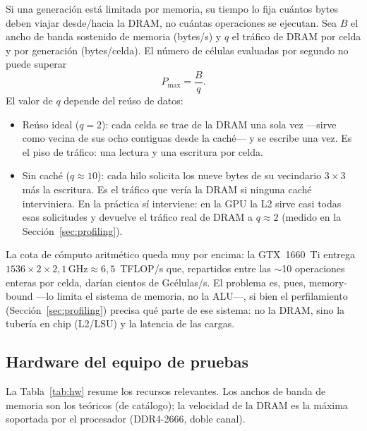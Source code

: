 \documentclass[
	spanish,
	letterpaper, oneside
]{article}
\begin{document}
Si una generación está limitada por memoria, su tiempo lo fija cuántos bytes deben
viajar desde/hacia la DRAM, no cuántas operaciones se ejecutan. Sea $B$ el ancho de
banda sostenido de memoria (bytes/s) y $q$ el tráfico de DRAM por celda y por
generación (bytes/celda). El número de células evaluadas por segundo no puede
superar
%
\begin{equation}
	P_{\max} = \frac{B}{q}.
	\label{eq:roofline}
\end{equation}
%
El valor de $q$ depende del reúso de datos:

\begin{itemize}
	\item Reúso ideal ($q = 2$): cada celda se trae de la DRAM una sola vez
	      ---sirve como vecina de sus ocho contiguas desde la caché--- y se escribe
	      una vez. Es el piso de tráfico: una lectura y una escritura por celda.
	\item Sin caché ($q \approx 10$): cada hilo solicita los nueve
	      bytes de su vecindario $3\times3$ más la escritura. Es el tráfico que vería
	      la DRAM si ninguna caché interviniera. En la práctica sí interviene: en la
	      GPU la L2 sirve casi todas esas solicitudes y devuelve el tráfico real de
	      DRAM a $q\approx2$ (medido en la Sección~\ref{sec:profiling}).
\end{itemize}

La cota de cómputo aritmético queda muy por encima: la GTX~1660~Ti entrega
$1536 \times 2 \times 2{,}1\,\text{GHz} \approx 6{,}5$~TFLOP/s que, repartidos entre
las $\sim$10 operaciones enteras por celda, darían cientos de Gcélulas/s. El problema
es, pues, memory-bound ---lo limita el sistema de memoria, no la ALU---, si bien
el perfilamiento (Sección~\ref{sec:profiling}) precisa qué parte de ese sistema:
no la DRAM, sino la tubería en chip (L2/LSU) y la latencia de las cargas.

\subsection{Hardware del equipo de pruebas}
\label{sec:hw}

La Tabla~\ref{tab:hw} resume los recursos relevantes. Los anchos de banda de memoria
son los teóricos (de catálogo); la velocidad de la DRAM es la máxima soportada por el
procesador (DDR4-2666, doble canal).
\end{document}

